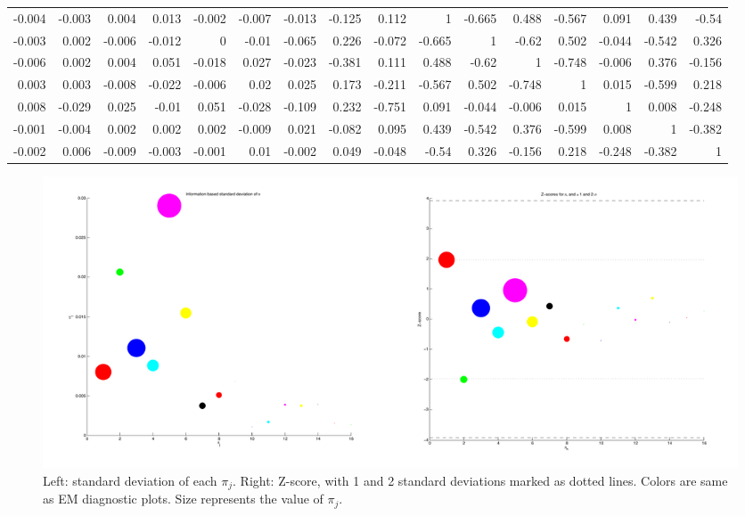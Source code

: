 \documentclass[12pt]{amsart}
\begin{document}
\begin{table}[h]
\begin{center}
\begin{tabular}{r r r r r r r r r r r r r r r r}
-0.004   &    -0.003   &     0.004   &     0.013   &    -0.002   &    -0.007   &    -0.013   &    -0.125   &     0.112   &         1   &    -0.665   &     0.488   &    -0.567   &     0.091   &     0.439   &     -0.54     \\
-0.003   &     0.002   &    -0.006   &    -0.012   &         0   &     -0.01   &    -0.065   &     0.226   &    -0.072   &    -0.665   &         1   &     -0.62   &     0.502   &    -0.044   &    -0.542   &     0.326     \\
-0.006   &     0.002   &     0.004   &     0.051   &    -0.018   &     0.027   &    -0.023   &    -0.381   &     0.111   &     0.488   &     -0.62   &         1   &    -0.748   &    -0.006   &     0.376   &    -0.156     \\
 0.003   &     0.003   &    -0.008   &    -0.022   &    -0.006   &      0.02   &     0.025   &     0.173   &    -0.211   &    -0.567   &     0.502   &    -0.748   &         1   &     0.015   &    -0.599   &     0.218     \\
 0.008   &    -0.029   &     0.025   &     -0.01   &     0.051   &    -0.028   &    -0.109   &     0.232   &    -0.751   &     0.091   &    -0.044   &    -0.006   &     0.015   &         1   &     0.008   &    -0.248     \\
-0.001   &    -0.004   &     0.002   &     0.002   &     0.002   &    -0.009   &     0.021   &    -0.082   &     0.095   &     0.439   &    -0.542   &     0.376   &    -0.599   &     0.008   &         1   &    -0.382     \\
-0.002   &     0.006   &    -0.009   &    -0.003   &    -0.001   &      0.01   &    -0.002   &     0.049   &    -0.048   &     -0.54   &     0.326   &    -0.156   &     0.218   &    -0.248   &    -0.382   &         1     \\
		\end{tabular}
	\end{center}
\end{table}

\begin{figure}
	\caption{Left: standard deviation of each $\pi_j$. Right: Z-score, with 1 and 2 standard deviations marked as dotted lines. Colors are same as EM diagnostic plots. Size represents the value of $\pi_j$.}
	\begin{center}
		\includegraphics[scale=0.35]{zsc.pdf}
	\end{center}
\end{figure}
\end{document}

